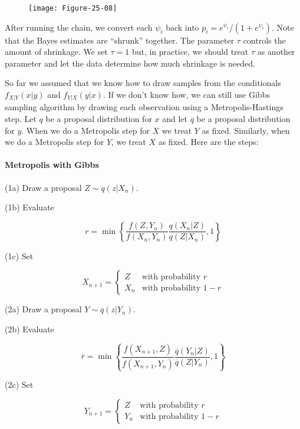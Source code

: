\begin{figure}[H]
\texttt{[image: Figure-25-08]}
\end{figure}

After running the chain, we convert each \(\psi_i\) back into
\(p_i = e^{\psi_i} / (1 + e^{\psi_i})\). Note that the Bayes estimates
are ``shrunk'' together. The parameter \(\tau\) controls the amount of
shrinkage. We set \(\tau = 1\) but, in practice, we should treat
\(\tau\) as another parameter and let the data determine how much
shrinkage is needed.

So far we assumed that we know how to draw samples from the conditionals
\(f_{X | Y}(x | y)\) and \(f_{Y | X}(y | x)\). If we don't know how, we
can still use Gibbs sampling algorithm by drawing each observation using
a Metropolis-Hastings step. Let \(q\) be a proposal distribution for
\(x\) and let \(\overline{q}\) be a proposal distribution for \(y\).
When we do a Metropolis step for \(X\) we treat \(Y\) as fixed.
Similarly, when we do a Metropolis step for \(Y\), we treat \(X\) as
fixed. Here are the steps:

\paragraph{Metropolis with Gibbs}\label{metropolis-with-gibbs}

(1a) Draw a proposal \(Z \sim q(z | X_n)\).

(1b) Evaluate

\[ r = \min \left\{ \frac{f(Z, Y_n)}{f(X_n, Y_n)} \frac{q(X_n | Z)}{q(Z | X_n)}, 1\right\} \]

(1c) Set

\[ X_{n+1} = \begin{cases}
Z &\text{with probability } r \\
X_{n} &\text{with probability } 1 - r
\end{cases} \]

(2a) Draw a proposal \(Y \sim \overline{q}(z | Y_n)\).

(2b) Evaluate

\[ \overline{r} = \min \left\{ \frac{f(X_{n+1}, Z)}{f(X_{n+1}, Y_n)} \frac{\overline{q}(Y_n | Z)}{\overline{q}(Z | Y_n)}, 1 \right\} \]

(2c) Set

\[ Y_{n+1} = \begin{cases}
Z &\text{with probability } r \\
Y_n &\text{with probability } 1 - r
\end{cases}
\]

